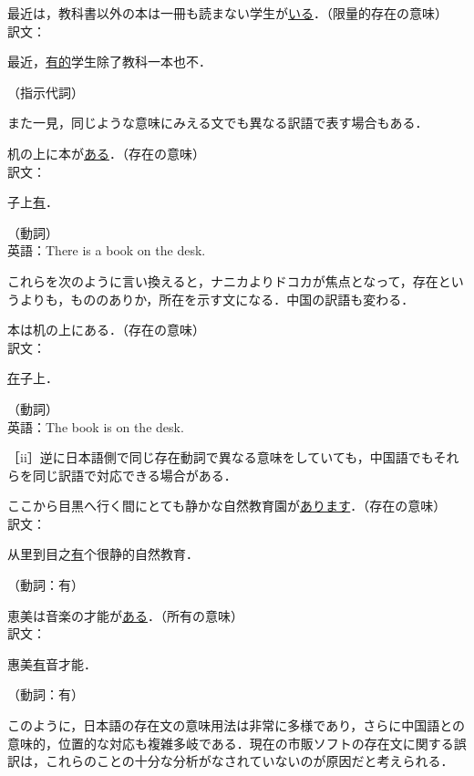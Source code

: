 \documentclass[japanese]{jnlp_1.4}
\newcommand{\inHRei}[1]{}
\begin{document}
\inHRei{(16)}
最近は，教科書以外の本は一冊も読まない学生が\ul{いる}．\hfill （限量的存在の意味）\\
訳文：\begin{簡体中文}最近，\ul{有的}学生除了教科一本也不．\end{簡体中文}\hfill （指示代詞）

また一見，同じような意味にみえる文でも異なる訳語で表す場合もある．

\inHRei{(17)}
机の上に本が\ul{ある}．\hfill （存在の意味）\\
訳文：\begin{簡体中文}子上\ul{有}．\end{簡体中文}\hfill （動詞）\\
英語：There is a book on the desk.

これらを次のように言い換えると，ナニカよりドコカが焦点となって，存在というよりも，もののありか，所在を示す文になる．中国の訳語も変わる．

\inHRei{(18)}
本は机の上にある．\hfill （存在の意味）\\
訳文：\begin{簡体中文}\ul{在}子上．\end{簡体中文}\hfill （動詞）\\
英語：The book is on the desk.

\noindent
［ii］逆に日本語側で同じ存在動詞で異なる意味をしていても，中国語でもそれらを同じ訳語で対応できる場合がある．

\inHRei{(19)}
ここから目黒へ行く間にとても静かな自然教育園が\ul{あります}．\hfill （存在の意味）\\
訳文：\begin{簡体中文}从里到目之\ul{有}个很静的自然教育．\end{簡体中文}\hfill （動詞：有）

\inHRei{(20)}
恵美は音楽の才能が\ul{ある}．\hfill （所有の意味）\\
訳文：\begin{簡体中文}惠美\ul{有}音才能．\end{簡体中文}\hfill （動詞：有）

このように，日本語の存在文の意味用法は非常に多様であり，さらに中国語との意味的，位置的な対応も複雑多岐である．現在の市販ソフトの存在文に関する誤訳は，これらのことの十分な分析がなされていないのが原因だと考えられる．
\end{document}
